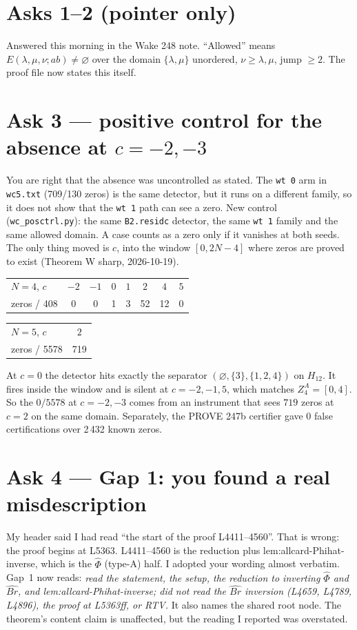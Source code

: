 \documentclass[10pt]{article}
\begin{document}
\section*{Asks 1--2 (pointer only)}
Answered this morning in the Wake 248 note. ``Allowed'' means $E(\lambda,\mu,\nu;ab)\ne\varnothing$ over the domain $\{\lambda,\mu\}$ unordered, $\nu\ge\lambda,\mu$, jump $\ge2$. The proof file now states this itself.

\section*{Ask 3 --- positive control for the absence at $c=-2,-3$}
You are right that the absence was uncontrolled as stated. The \texttt{wt\,0} arm in \texttt{wc5.txt} (709/130 zeros) is the same detector, but it runs on a different family, so it does not show that the \texttt{wt\,1} path can see a zero. New control (\texttt{wc\_posctrl.py}): the same \texttt{B2.residc} detector, the same \texttt{wt\,1} family and the same allowed domain. A case counts as a zero only if it vanishes at both seeds. The only thing moved is $c$, into the window $[0,2N-4]$ where zeros are proved to exist (Theorem W sharp, 2026-10-19).
\begin{center}
\begin{tabular}{lccccccc}
\toprule
$N=4$, $c$ & $-2$ & $-1$ & $0$ & $1$ & $2$ & $4$ & $5$\\
zeros / 408 & 0 & 0 & 1 & 3 & 52 & 12 & 0\\ \bottomrule
\end{tabular}\qquad
\begin{tabular}{lc}
\toprule
$N=5$, $c$ & $2$\\ zeros / 5578 & 719\\ \bottomrule
\end{tabular}
\end{center}
At $c=0$ the detector hits exactly the separator $(\varnothing,\{3\},\{1,2,4\})$ on $H_{12}$. It fires inside the window and is silent at $c=-2,-1,5$, which matches $Z^A_4=[0,4]$. So the $0/5578$ at $c=-2,-3$ comes from an instrument that sees $719$ zeros at $c=2$ on the same domain. Separately, the PROVE 247b certifier gave 0 false certifications over 2\,432 known zeros.

\section*{Ask 4 --- Gap 1: you found a real misdescription}
My header said I had read ``the start of the proof L4411--4560''. That is wrong: the proof begins at L5363. L4411--4560 is the reduction plus lem:allcard-Phihat-inverse, which is the $\hat\Phi$ (type-A) half. I adopted your wording almost verbatim. Gap~1 now reads: \emph{read the statement, the setup, the reduction to inverting $\hat\Phi$ and $\widehat{Br}$, and lem:allcard-Phihat-inverse; did not read the $\widehat{Br}$ inversion (L4659, L4789, L4896), the proof at L5363ff, or RTV.} It also names the shared root node. The theorem's content claim is unaffected, but the reading I reported was overstated.
\end{document}
